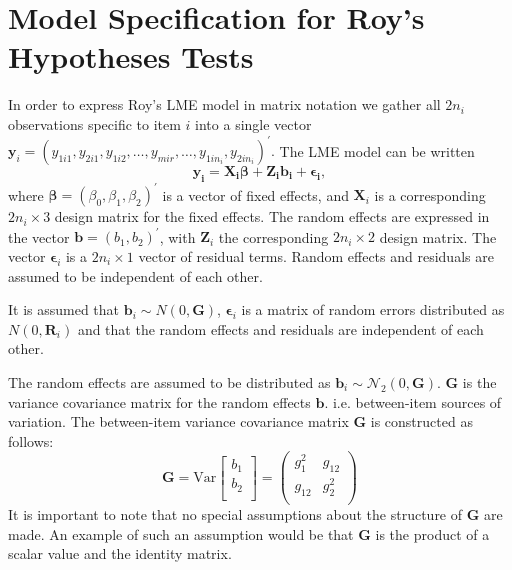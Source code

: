 \documentclass[12pt, a4paper]{report}
\theoremstyle{plain}
\theoremstyle{definition}
\theoremstyle{remark}
\begin{document}
	\newpage
	




\newpage


		\section{Model Specification for Roy's Hypotheses Tests}
		
		In order to express Roy's LME model in matrix notation we gather all $2n_i$ observations specific to item $i$ into a single vector  $\boldsymbol{y}_{i} = (y_{1i1},y_{2i1},y_{1i2},\ldots,y_{mir},\ldots,y_{1in_{i}},y_{2in_{i}})^\prime.$ The LME model can be written
		\[
		\boldsymbol{y_{i}} = \boldsymbol{X_{i}\beta} + \boldsymbol{Z_{i}b_{i}} + \boldsymbol{\epsilon_{i}},
		\]
		where $\boldsymbol{\beta}=(\beta_0,\beta_1,\beta_2)^\prime$ is a vector of fixed effects, and $\boldsymbol{X}_i$ is a corresponding $2n_i\times 3$ design matrix for the fixed effects. The random effects are expressed in the vector $\boldsymbol{b}=(b_1,b_2)^\prime$, with $\boldsymbol{Z}_i$ the corresponding $2n_i\times 2$ design matrix. The vector $\boldsymbol{\epsilon}_i$ is a $2n_i\times 1$ vector of residual terms. Random effects and residuals are assumed to be independent of each other.
		
		It is assumed that $\boldsymbol{b}_i \sim N(0,\boldsymbol{G})$, $\boldsymbol{\epsilon}_i$ is a matrix of random errors distributed as $N(0,\boldsymbol{R}_i)$ and that the random effects and residuals are 
		independent of each other.
		
		The random effects are assumed to be distributed as $\boldsymbol{b}_i \sim \mathcal{N}_2(0,\boldsymbol{G})$. 	$\boldsymbol{G}$ is the variance covariance matrix for the random effects $\boldsymbol{b}$.
		i.e. between-item sources of variation. The between-item variance covariance matrix $\boldsymbol{G}$ is constructed as follows:
		\[ \boldsymbol{G} = \mbox{Var}  \left[
		\begin{array}{c}
		b_1   \\
		b_2  \\
		\end{array}
		\right] =  \left(
		\begin{array}{cc}
		g^2_1  & g_{12} \\
		g_{12} & g^2_2 \\
		\end{array}
		\right) \]
		It is important to note that no special assumptions about the structure of $\boldsymbol{G}$ are made. An example of such an assumption would be that $\boldsymbol{G}$ is the product of a scalar value and the identity matrix.
		
\end{document}
